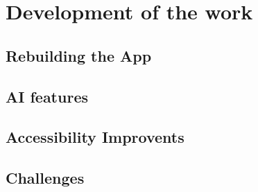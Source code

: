 \section{Development of the work}
\subsection{Rebuilding the App}
\subsection{AI features}
\subsection{Accessibility Improvents}
\subsection{Challenges}